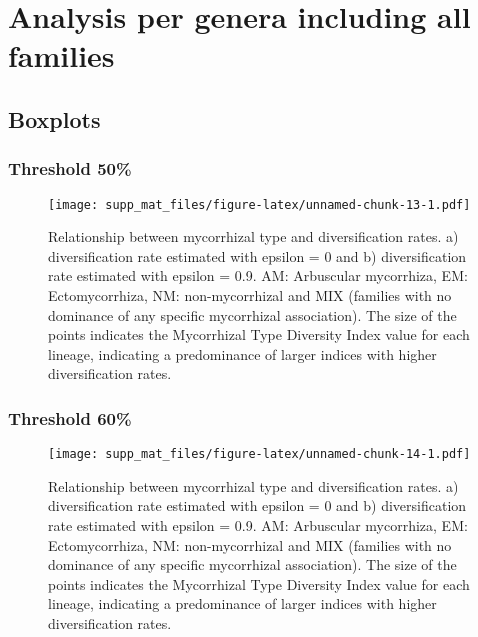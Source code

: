 \documentclass[]{article}
\begin{document}
\hypertarget{analysis-per-genera-including-all-families}{%
\section{Analysis per genera including all
families}\label{analysis-per-genera-including-all-families}}

\hypertarget{boxplots-1}{%
\subsection{Boxplots}\label{boxplots-1}}

\hypertarget{threshold-50-1}{%
\subsubsection{Threshold 50\%}\label{threshold-50-1}}

\begin{figure}
\centering
\texttt{[image: supp\_mat\_files/figure-latex/unnamed-chunk-13-1.pdf]}
\caption{Relationship between mycorrhizal type and diversification
rates. a) diversification rate estimated with epsilon = 0 and b)
diversification rate estimated with epsilon = 0.9. AM: Arbuscular
mycorrhiza, EM: Ectomycorrhiza, NM: non-mycorrhizal and MIX (families
with no dominance of any specific mycorrhizal association). The size of
the points indicates the Mycorrhizal Type Diversity Index value for each
lineage, indicating a predominance of larger indices with higher
diversification rates.}
\end{figure}

\hypertarget{threshold-60-1}{%
\subsubsection{Threshold 60\%}\label{threshold-60-1}}

\begin{figure}
\centering
\texttt{[image: supp\_mat\_files/figure-latex/unnamed-chunk-14-1.pdf]}
\caption{Relationship between mycorrhizal type and diversification
rates. a) diversification rate estimated with epsilon = 0 and b)
diversification rate estimated with epsilon = 0.9. AM: Arbuscular
mycorrhiza, EM: Ectomycorrhiza, NM: non-mycorrhizal and MIX (families
with no dominance of any specific mycorrhizal association). The size of
the points indicates the Mycorrhizal Type Diversity Index value for each
lineage, indicating a predominance of larger indices with higher
diversification rates.}
\end{figure}
\end{document}
